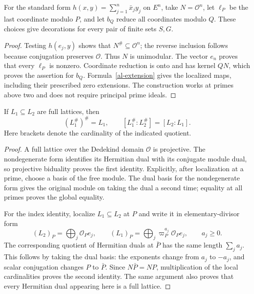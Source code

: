 \begin{proposition}\label{al-base}
For the standard form $h(x,y)=\sum_{j=1}^n\bar x_jy_j$ on $E^n$,
take $N=\mathcal O^n$, let $\ell_P$ be the last coordinate modulo
$P$, and let $b_Q$ reduce all coordinates modulo $Q$.
These choices give decorations for every pair of finite sets $S,G$.
\end{proposition}
\begin{proof}
Testing $h(e_j,y)$ shows that $N^\#\subseteq\mathcal O^n$;
the reverse inclusion follows because conjugation preserves
$\mathcal O$. Thus $N$ is unimodular. The vector $e_n$ proves
that every $\ell_P$ is nonzero. Coordinate reduction is onto and
has kernel $QN$, which proves the assertion for $b_Q$.
Formula~\eqref{al-extension} gives the localized maps, including
their prescribed zero extensions. The construction works at
primes above two and does not require principal prime ideals.
\end{proof}

\begin{lemma}\label{al-dual-index}
If $L_1\subseteq L_2$ are full lattices, then
\[
 (L_1^\#)^\#=L_1,\qquad
 [L_1^\#:L_2^\#]=[L_2:L_1].
\]
Here brackets denote the cardinality of the indicated quotient.
\end{lemma}
\begin{proof}
A full lattice over the Dedekind domain $\mathcal O$ is projective.
The nondegenerate form identifies its Hermitian dual with its
conjugate module dual, so projective biduality proves the first
identity. Explicitly, after localization at a prime, choose a basis
of the free module. The dual basis for the nondegenerate form gives
the original module on taking the dual a second time; equality at
all primes proves the global equality.

For the index identity, localize $L_1\subseteq L_2$ at $P$ and
write it in elementary-divisor form
\[
 (L_2)_P=\bigoplus_j\mathcal O_Pe_j,\qquad
 (L_1)_P=\bigoplus_j\varpi_P^{a_j}\mathcal O_Pe_j,
                 \qquad a_j\geq0.
\]
The corresponding quotient of Hermitian duals at $\bar P$ has
the same length $\sum_ja_j$. This follows by taking the dual
basis: the exponents change from $a_j$ to $-a_j$, and scalar
conjugation changes $P$ to $\bar P$. Since
$N\bar P=NP$, multiplication of the local cardinalities proves
the second identity. The same argument also proves that every
Hermitian dual appearing here is a full lattice.
\end{proof}


